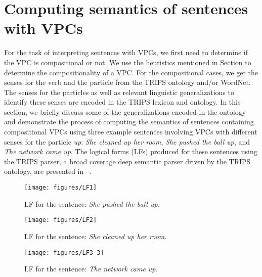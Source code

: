 \documentclass[output=paper
,modfonts
,nonflat]{langsci/langscibook}
\begin{document}
\section{Computing semantics of sentences with VPCs} \label{sec:generalizations}

For the task of interpreting sentences with VPCs, we first need to determine if the VPC is compositional or not. We use the heuristics mentioned in Section  to determine the compositionality of a VPC. For the compositional cases, we get the senses for the verb and the particle from the TRIPS ontology and/or WordNet. The senses for the particles as well as relevant linguistic generalizations to identify these senses are encoded in the TRIPS lexicon and ontology. 
In this section, we briefly discuss some of the generalizations encoded in the ontology and demonstrate the process of computing the semantics of sentences containing compositional VPCs using three example sentences involving VPCs with different senses for the particle \textit{up}: \textit{She cleaned up her room}, \textit{She pushed the ball up}, and \textit{The network came up}. The logical forms (LFs) produced for these sentences using the TRIPS parser, a broad coverage deep semantic parser driven by the TRIPS ontology, are presented in --.


\begin{figure}[t]
\vspace*{-1mm}
\texttt{[image: figures/LF1]}
\vspace*{-2mm}
\caption{LF for the sentence: \textit{She pushed the ball up.} }\label{fig:lf1}
\end{figure}

\begin{figure}[t]
\vspace*{-1mm}
\texttt{[image: figures/LF2]}
\vspace*{-2mm}
\caption{LF for the sentence: \textit{She cleaned up her room.} }\label{fig:lf2}
\end{figure}

\begin{figure}[!t]
\vspace*{-1mm}
\texttt{[image: figures/LF3\_3]}
\vspace*{-2mm}
\caption{LF for the sentence: \textit{The network came up.}}\label{fig:lf3}
\end{figure}
\end{document}
